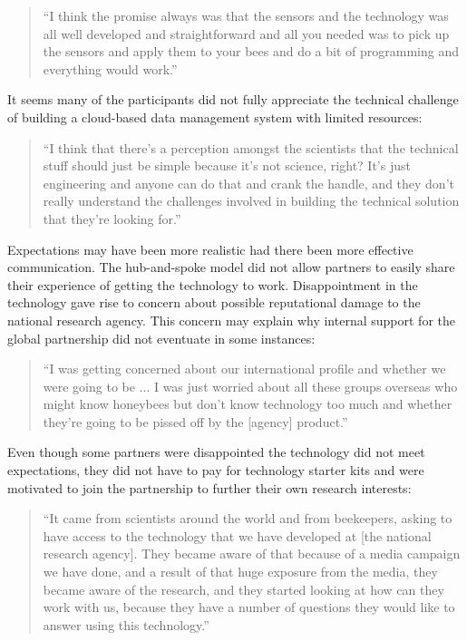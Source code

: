 \begin{quote}
\small
\enquote{I think the promise always was that the sensors and the technology was all well developed and straightforward and all you needed was to pick up the sensors and apply them to your bees and do a bit of programming and everything would work.} \\
\end{quote}

It seems many of the participants did not fully appreciate the technical challenge of building a cloud-based data management system with limited resources:

\begin{quote}
\small
\enquote{I think that there's a perception amongst the scientists that the technical stuff should just be simple because it's not science, right? It's just engineering and anyone can do that and crank the handle, and they don't really understand the challenges involved in building the technical solution that they're looking for.} \\
\end{quote}

Expectations may have been more realistic had there been more effective communication. The hub-and-spoke model did not allow partners to easily share their experience of getting the technology to work. Disappointment in the technology gave rise to concern about possible reputational damage to the national research agency. This concern may explain why internal support for the global partnership did not eventuate in some instances:

\begin{quote}
\small
\enquote{I was getting concerned about our international profile and whether we were going to be ... I was just worried about all these groups overseas who might know honeybees but don't know technology too much and whether they're going to be pissed off by the [agency] product.} \\
\end{quote}

Even though some partners were disappointed the technology did not meet expectations, they did not have to pay for technology starter kits and were motivated to join the partnership to further their own research interests:

\begin{quote}
\small
\enquote{It came from scientists around the world and from beekeepers, asking to have access to the technology that we have developed at [the national research agency]. They became aware of that because of a media campaign we have done, and a result of that huge exposure from the media, they became aware of the research, and they started looking at how can they work with us, because they have a number of questions they would like to answer using this technology.} \\
\end{quote}

